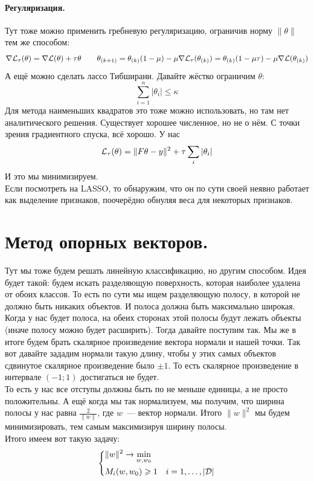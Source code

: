 \documentclass{article}
\begin{document}
    \paragraph{Регуляризация.}
    Тут тоже можно применить гребневую регуляризацию, ограничив норму $\|\theta\|$ тем же способом:
    \[
    \nabla{\mathcal{L}}_\tau(\theta)=\nabla{\mathcal{L}}(\theta)+\tau\theta
    \qquad
    \theta_{(k+1)}=\theta_{(k)}(1-\mu)-\mu\nabla{\mathcal{L}}_\tau(\theta_{(k)})=\theta_{(k)}(1-\mu\tau)-\mu\nabla{\mathcal{L}}(\theta_{(k)})
    \]
    А ещё можно сделать лассо Тибширани. Давайте жёстко ограничим $\theta$:
    \[
    \sum\limits_{i=1}^n|\theta_i|\leqslant\kappa
    \]
    Для метода наименьших квадратов это тоже можно использовать, но там нет аналитического решения. Существует хорошее численное, но не о нём. С точки зрения градиентного спуска, всё хорошо. У нас
    \[
    {\mathcal{L}}_\tau(\theta)=\|F\theta-y\|^2+\tau\sum_i|\theta_i|
    \]
    И это мы минимизируем.\\
    Если посмотреть на LASSO, то обнаружим, что он по сути своей неявно работает как выделение признаков, поочерёдно обнуляя веса для некоторых признаков.
    \section{Метод опорных векторов.}
    Тут мы тоже будем решать линейную классификацию, но другим способом. Идея будет такой: будем искать разделяющую поверхность, которая наиболее удалена от обоих классов. То есть по сути мы ищем разделяющую полосу, в которой не должно быть никаких объектов. И полоса должна быть максимально широкая.\\
    Когда у нас будет полоса, на обеих сторонах этой полосы будут лежать объекты (иначе полосу можно будет расширить). Тогда давайте поступим так. Мы же в итоге будем брать скалярное произведение вектора нормали и нашей точки. Так вот давайте зададим нормали такую длину, чтобы у этих самых объектов сдвинутое скалярное произведение было $\pm1$. То есть скалярное произведение в интервале $(-1;1)$ достигаться не будет.\\
    То есть у нас все отступы должны быть по не меньше единицы, а не просто положительны. А ещё когда мы так нормализуем, мы получим, что ширина полосы у нас равна $\frac2{\|w\|}$, где $w$~--- вектор нормали. Итого $\|w\|^2$ мы будем минимизировать, тем самым максимизируя ширину полосы.\\
    Итого имеем вот такую задачу:
    \[
    \left\{\begin{aligned}
        &\|w\|^2\to\min_{w,w_0}&\\
        &M_i(w,w_0)\geqslant1&i=1,\ldots,|{\mathcal{D}}|
    \end{aligned}\right.
    \]
\end{document}
